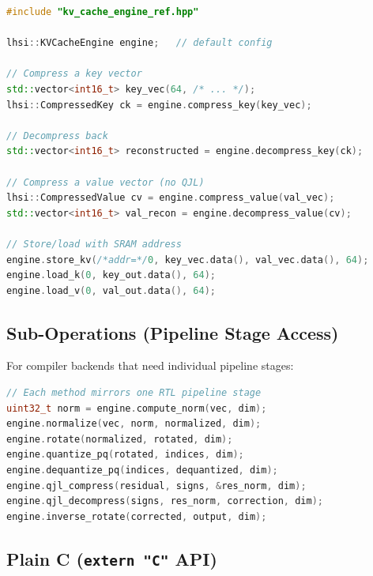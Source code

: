 \documentclass[11pt]{article}
\begin{document}
\begin{lstlisting}[language=C++]
#include "kv_cache_engine_ref.hpp"

lhsi::KVCacheEngine engine;   // default config

// Compress a key vector
std::vector<int16_t> key_vec(64, /* ... */);
lhsi::CompressedKey ck = engine.compress_key(key_vec);

// Decompress back
std::vector<int16_t> reconstructed = engine.decompress_key(ck);

// Compress a value vector (no QJL)
lhsi::CompressedValue cv = engine.compress_value(val_vec);
std::vector<int16_t> val_recon = engine.decompress_value(cv);

// Store/load with SRAM address
engine.store_kv(/*addr=*/0, key_vec.data(), val_vec.data(), 64);
engine.load_k(0, key_out.data(), 64);
engine.load_v(0, val_out.data(), 64);
\end{lstlisting}

\subsection{Sub-Operations (Pipeline Stage Access)}

For compiler backends that need individual pipeline stages:

\begin{lstlisting}[language=C++]
// Each method mirrors one RTL pipeline stage
uint32_t norm = engine.compute_norm(vec, dim);
engine.normalize(vec, norm, normalized, dim);
engine.rotate(normalized, rotated, dim);
engine.quantize_pq(rotated, indices, dim);
engine.dequantize_pq(indices, dequantized, dim);
engine.qjl_compress(residual, signs, &res_norm, dim);
engine.qjl_decompress(signs, res_norm, correction, dim);
engine.inverse_rotate(corrected, output, dim);
\end{lstlisting}

\subsection{Plain C (\texttt{extern "C"} API)}
\end{document}
